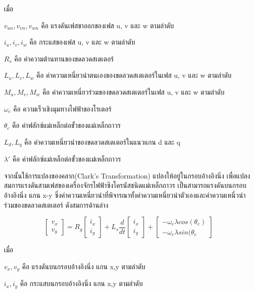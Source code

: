 \documentclass[11pt,a4paper]{article}
\begin{document}
เมื่อ

$v_{un},v_{vn},v_{wn}$ คือ แรงดันเฟสขาออกของเฟส u, v และ w ตามลำดับ

$i_{u},i_{v},i_{w}$      คือ กระแสของเฟส u, v และ w ตามลำดับ

$R_{s}$               คือ ค่าความต้านทานของขดลวดสเตเตอร์

$L_{u},L_{v},L_{w}$        คือ ค่าความเหนี่ยวนำตนเองของขดลวดสเตเตอร์ในเฟส u, v และ w ตามลำดับ

$M_{u},M_{v},M_{w}$       คือ ค่าความเหนี่ยวร่วมของขดลวดสเตเตอร์ในเฟส u, v และ w ตามลำดับ

$\omega_{e}$                    คือ ความเร็วเชิงมุมทางไฟฟ้าของโรเตอร์

$\theta_{e}$               คือ ค่าฟลักซ์แม่เหล็กต่อขั้วของแม่เหล็กถาวร

$L_{d},L_{q}$                      คือ ค่าความเหนี่ยวนำของขดลวดสเตเตอร์ในแนวแกน d และ q

$\lambda'$ คือ ค่าฟลักซ์แม่เหล็กต่อขั้วของแม่เหล็กถาวร

จากนั้นใช้การแปลงของคลาก(Clark’s Transformation) \cite{sswch3} \cite{vectorIEEE} แปลงให้อยู่ในกรอบอ้างอิงนิ่ง เพื่อแปลงสมการแรงดันสามเฟสของเครื่องจักรไฟฟ้าซิงโครนัสชนิดแม่เหล็กถาวร เป็นสามารถแรงดันบนกรอบอ้างอิงนิ่ง แกน x-y ซึ่งค่าความเหนี่ยวนำที่พิจารณาทั้งค่าความเหนี่ยวนำตัวเองและค่าความเหนี่วนำร่วมของขดลวดสเตเตอร์ ดังสมการด้านล่าง

\begin{equation}
    \begin{bmatrix}
        v_{x} \\v_{y}
    \end{bmatrix} = R_{g}
    \begin{bmatrix}
        i_{x} \\i_{y}
    \end{bmatrix} + L_{s}\frac{d}{dt}
    \begin{bmatrix}
        i_{x} \\i_{y}
    \end{bmatrix}+
    \begin{bmatrix}
        -\omega_{e} \lambda cos(\theta_{e}) \\-\omega_{e} \lambda sin(\theta_{e}
    \end{bmatrix}
\end{equation}

เมื่อ

$v_{x},v_{y}$ คือ แรงดันบนกรอบอ้างอิงนิ่ง แกน x,y ตามลำดับ

$i_{x},i_{y}$      คือ กระแสบนกรอบอ้างอิงนิ่ง แกน x,y ตามลำดับ
\end{document}

